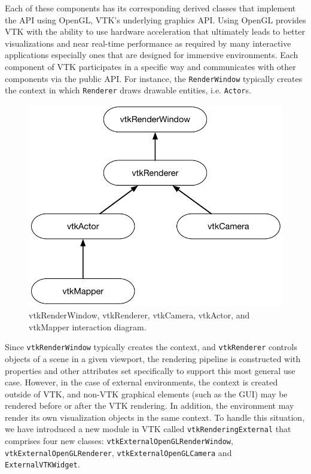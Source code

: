 Each of these components has its corresponding derived classes that implement the API using OpenGL, VTK's underlying graphics API.
Using OpenGL provides VTK with the ability to use hardware acceleration that ultimately leads to better visualizations and near real-time performance as required by many interactive applications especially ones that are designed for immersive environments.
Each component of VTK participates in a specific way and communicates with other components via the public API.
For instance, the \texttt{RenderWindow} typically creates the context in which
\texttt{Renderer} draws drawable entities, i.e. \texttt{Actor}s.

\begin{figure}[h!]
  \centering
  \includegraphics[scale=0.5]{images/vtkRenderPipeline.pdf}
  \caption{vtkRenderWindow, vtkRenderer, vtkCamera, vtkActor, and vtkMapper interaction diagram.}
  \label{fig:vtkRenderPipeline}
\end{figure}

Since \texttt{vtkRenderWindow} typically creates the context, and \texttt{vtkRenderer} controls objects of a scene in a given viewport, the rendering pipeline is constructed with properties and other attributes set specifically to support this most general use case.
However, in the case of external environments, the context is created outside of VTK, and non-VTK graphical elements (such as the GUI) may be rendered before or after the VTK rendering.
In addition, the environment may render its own visualization objects in the same context.
To handle this situation, we have introduced a new module in VTK called \texttt{vtkRenderingExternal} that comprises four new classes: \texttt{vtkExternalOpenGLRenderWindow}, \texttt{vtkExternalOpenGLRenderer}, \texttt{vtkExternalOpenGLCamera} and \texttt{ExternalVTKWidget}. 

